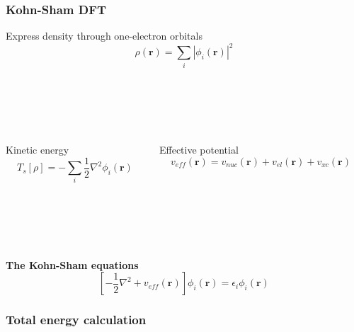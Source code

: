 \documentclass[mathserif, 8pt]{beamer}
\begin{document}
\begin{frame}
    \frametitle{Kohn-Sham DFT}
    \centering
    Express density through one-electron orbitals
    \begin{equation}
	\nonumber
	\rho(\boldsymbol{r}) = \sum_i |\phi_i(\boldsymbol{r})|^2
    \end{equation}
    \ \\
    \ \\
    \ \\
    \ \\
    \pause
    \begin{columns}
    \begin{column}{.50\textwidth}
    \centering
    Kinetic energy
    \begin{equation}
	\nonumber
	T_s[\rho] = -\sum_i \frac{1}{2}\nabla^2\phi_i(\boldsymbol{r})
    \end{equation}
    \end{column}
    \begin{column}{.50\textwidth}
    \centering
    Effective potential
    \begin{equation}
	\nonumber
	v_{eff}(\boldsymbol{r}) = v_{nuc}(\boldsymbol{r}) + v_{el}(\boldsymbol{r}) + v_{xc}(\boldsymbol{r})
    \end{equation}
    \end{column}
    \end{columns}
    \ \\
    \ \\
    \ \\
    \ \\
    \pause
    \centering
    \textbf{The Kohn-Sham equations}
    \begin{equation}
	\nonumber
	\left[-\frac{1}{2}\nabla^2 + v_{eff}(\boldsymbol{r})\right]\phi_i(\boldsymbol{r}) = 
	\epsilon_i\phi_i(\boldsymbol{r})
    \end{equation}
\end{frame}

\begin{frame}
    \frametitle{Total energy calculation}
\end{frame}
\end{document}
